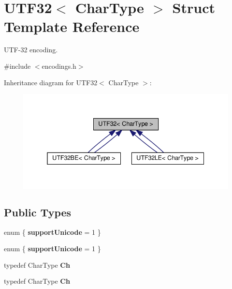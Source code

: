\hypertarget{structUTF32}{}\section{U\+T\+F32$<$ Char\+Type $>$ Struct Template Reference}
\label{structUTF32}


U\+T\+F-\/32 encoding.  




{\ttfamily \#include $<$encodings.\+h$>$}



Inheritance diagram for U\+T\+F32$<$ Char\+Type $>$\+:
\nopagebreak
\begin{figure}[H]
\begin{center}
\leavevmode
\includegraphics[width=338pt]{structUTF32__inherit__graph}
\end{center}
\end{figure}
\subsection*{Public Types}
\begin{DoxyCompactItemize}
\item 
\mbox{\label{structUTF32_a54edb22757a982db8681caaa0de3a26f}} 
enum \{ {\bfseries support\+Unicode} = 1
 \}
\item 
\mbox{\label{structUTF32_a36577695659e765bd3f88daed6e53010}} 
enum \{ {\bfseries support\+Unicode} = 1
 \}
\item 
\mbox{\label{structUTF32_ab4502672d56436e730ca5f647bb52be9}} 
typedef Char\+Type {\bfseries Ch}
\item 
\mbox{\label{structUTF32_ab4502672d56436e730ca5f647bb52be9}} 
typedef Char\+Type {\bfseries Ch}
\end{DoxyCompactItemize}
